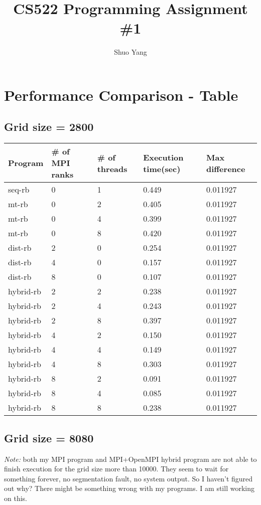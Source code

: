 \documentclass[11pt]{article}
\title{CS522 Programming Assignment \#1}
\author{Shuo Yang}
\begin{document}
\maketitle

\section{Performance Comparison - Table}

\subsection{Grid size = 2800}
\begin{center}
  \begin{tabular}{| l | l | l | l | l |}
    \hline
    Program & \# of MPI ranks & \# of threads & Execution time(sec) & Max difference
    \\ \hline
    seq-rb & 0 & 1 & 0.449 & 0.011927 \\ \hline
    mt-rb & 0 & 2 & 0.405  & 0.011927 \\ \hline
    mt-rb & 0 & 4 & 0.399 & 0.011927 \\ \hline
    mt-rb & 0 & 8 & 0.420 & 0.011927 \\ \hline
    dist-rb & 2 & 0 & 0.254 & 0.011927 \\ \hline
    dist-rb & 4 & 0 & 0.157 & 0.011927 \\ \hline
    dist-rb & 8 & 0 & 0.107 & 0.011927 \\ \hline
    hybrid-rb & 2 & 2 & 0.238 & 0.011927 \\ \hline
    hybrid-rb & 2 & 4 & 0.243 & 0.011927 \\ \hline
    hybrid-rb & 2 & 8 & 0.397 & 0.011927 \\ \hline
    hybrid-rb & 4 & 2 & 0.150 & 0.011927 \\ \hline
    hybrid-rb & 4 & 4 & 0.149 & 0.011927 \\ \hline
    hybrid-rb & 4 & 8 & 0.303 & 0.011927 \\ \hline
    hybrid-rb & 8 & 2 & 0.091 & 0.011927 \\ \hline
    hybrid-rb & 8 & 4 & 0.085 & 0.011927 \\ \hline
    hybrid-rb & 8 & 8 & 0.238 & 0.011927 \\ \hline
  \end{tabular}
\end{center}

\subsection{Grid size = 8080}
\emph{Note:} both my MPI program and MPI+OpenMPI hybrid program are
not able to finish execution for the grid size more than 10000. They
seem to wait for something forever, no segmentation fault, no system
output. So I haven't figured out why? There might be something wrong
with my programs. I am still working on this.
\end{document}

